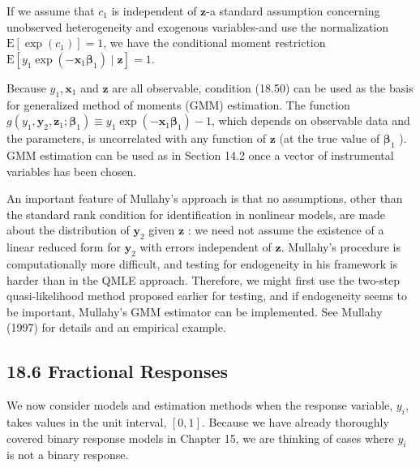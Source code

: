 \documentclass[10pt]{article}
\begin{document}
If we assume that $c_{1}$ is independent of $\mathbf{z}$-a standard assumption concerning unobserved heterogeneity and exogenous variables-and use the normalization $\mathrm{E}\left[\exp \left(c_{1}\right)\right]=1$, we have the conditional moment restriction\\
$\mathrm{E}\left[y_{1} \exp \left(-\mathbf{x}_{1} \boldsymbol{\beta}_{1}\right) \mid \mathbf{z}\right]=1$.

Because $y_{1}, \mathbf{x}_{1}$ and $\mathbf{z}$ are all observable, condition (18.50) can be used as the basis for generalized method of moments (GMM) estimation. The function $g\left(y_{1}, \mathbf{y}_{2}, \mathbf{z}_{1} ; \boldsymbol{\beta}_{1}\right) \equiv y_{1} \exp \left(-\mathbf{x}_{1} \boldsymbol{\beta}_{1}\right)-1$, which depends on observable data and the parameters, is uncorrelated with any function of $\mathbf{z}$ (at the true value of $\boldsymbol{\beta}_{1}$ ). GMM estimation can be used as in Section 14.2 once a vector of instrumental variables has been chosen.

An important feature of Mullahy's approach is that no assumptions, other than the standard rank condition for identification in nonlinear models, are made about the distribution of $\mathbf{y}_{2}$ given $\mathbf{z}$ : we need not assume the existence of a linear reduced form for $\mathbf{y}_{2}$ with errors independent of $\mathbf{z}$. Mullahy's procedure is computationally more difficult, and testing for endogeneity in his framework is harder than in the QMLE approach. Therefore, we might first use the two-step quasi-likelihood method proposed earlier for testing, and if endogeneity seems to be important, Mullahy's GMM estimator can be implemented. See Mullahy (1997) for details and an empirical example.

\subsection*{18.6 Fractional Responses}
We now consider models and estimation methods when the response variable, $y_{i}$, takes values in the unit interval, $[0,1]$. Because we have already thoroughly covered binary response models in Chapter 15, we are thinking of cases where $y_{i}$ is not a binary response.
\end{document}
